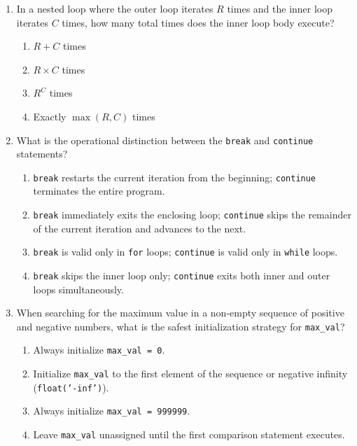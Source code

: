 \documentclass[11pt,a4paper]{article}
\begin{document}
\begin{enumerate}[label=\textbf{Q\arabic*.},leftmargin=2em,itemsep=1.5pt,topsep=1pt,resume]

\item In a nested loop where the outer loop iterates $R$ times and the inner loop iterates $C$ times, how many total times does the inner loop body execute?
\begin{enumerate}[label=\Alph*.,leftmargin=2em]
  \item $R + C$ times
  \item $R \times C$ times
  \item $R^C$ times
  \item Exactly $\max(R, C)$ times
\end{enumerate}

\item What is the operational distinction between the \texttt{break} and \texttt{continue} statements?
\begin{enumerate}[label=\Alph*.,leftmargin=2em]
  \item \texttt{break} restarts the current iteration from the beginning; \texttt{continue} terminates the entire program.
  \item \texttt{break} immediately exits the enclosing loop; \texttt{continue} skips the remainder of the current iteration and advances to the next.
  \item \texttt{break} is valid only in \texttt{for} loops; \texttt{continue} is valid only in \texttt{while} loops.
  \item \texttt{break} skips the inner loop only; \texttt{continue} exits both inner and outer loops simultaneously.
\end{enumerate}

\item When searching for the maximum value in a non-empty sequence of positive and negative numbers, what is the safest initialization strategy for \texttt{max\_val}?
\begin{enumerate}[label=\Alph*.,leftmargin=2em]
  \item Always initialize \texttt{max\_val = 0}.
  \item Initialize \texttt{max\_val} to the first element of the sequence or negative infinity (\texttt{float('-inf')}).
  \item Always initialize \texttt{max\_val = 999999}.
  \item Leave \texttt{max\_val} unassigned until the first comparison statement executes.
\end{enumerate}


\end{enumerate}
\end{document}
